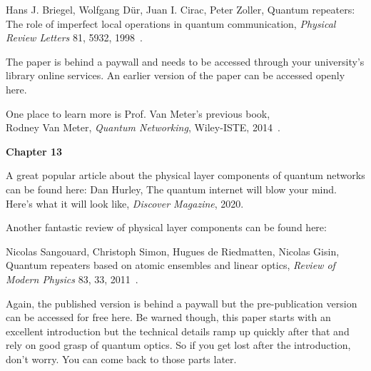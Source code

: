 Hans J. Briegel, Wolfgang Dür, Juan I. Cirac, Peter Zoller, Quantum repeaters: The role of imperfect local operations in quantum communication, \emph{Physical Review Letters} 81, 5932, 1998~\cite{briegel98:_quant_repeater}.

The paper is behind a paywall and needs to be accessed through your university’s library online services. An earlier version of the paper can be accessed openly here.

One place to learn more is Prof. Van Meter's previous book,\\
Rodney Van Meter, \emph{Quantum Networking}, Wiley-ISTE, 2014~\cite{van-meter14:_quantum_networking}.



{\bf Chapter 13}

A great popular article about the physical layer components of quantum networks can be found here:
Dan Hurley, The quantum internet will blow your mind. Here’s what it will look like, \emph{Discover Magazine}, 2020.

Another fantastic review of physical layer components can be found here:

Nicolas Sangouard, Christoph Simon, Hugues de Riedmatten, Nicolas Gisin, Quantum repeaters based on atomic ensembles and linear optics, \emph{Review of Modern Physics} 83, 33, 2011~\cite{sangouard2011quantum}.

Again, the published version is behind a paywall but the pre-publication version can be accessed for free here. Be warned though, this paper starts with an excellent introduction but the technical details ramp up quickly after that and rely on good grasp of quantum optics. So if you get lost after the introduction, don’t worry. You can come back to those parts later.
